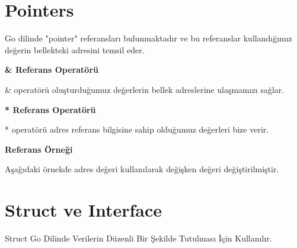 \section{Pointers}
\vspace{5mm}

Go dilinde "pointer" referansları bulunmaktadır ve bu referanslar kullandığımız değerin bellekteki adresini temsil eder.
\vspace{20mm}

\textbf{\& Referans Operatörü } 
\vspace{7mm}

\& operatörü oluşturduğumuz değerlerin bellek adreslerine ulaşmamızı sağlar.

\vspace{5mm}


\vspace{10mm}

\textbf{* Referans Operatörü } 
\vspace{7mm}

* operatörü adres referans bilgisine sahip olduğumuz değerleri bize verir.

\vspace{5mm}



\vspace{10mm}
\textbf{Referans Örneği}
\vspace{5mm}

Aşağıdaki örnekde adres değeri kullanılarak değişken değeri değiştirilmiştir.

\vspace{5mm}


\vspace{10mm}

\newpage

\section{Struct ve Interface}
\vspace{5mm}

Struct Go Dilinde Verilerin Düzenli Bir Şekilde Tutulması İçin Kullanılır.
\vspace{7mm}



